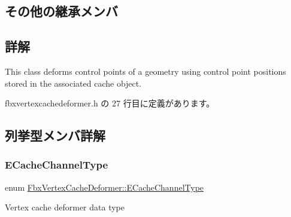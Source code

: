 \subsection*{その他の継承メンバ}


\subsection{詳解}
This class deforms control points of a geometry using control point positions stored in the associated cache object. 

 fbxvertexcachedeformer.\+h の 27 行目に定義があります。



\subsection{列挙型メンバ詳解}
\mbox{\label{class_fbx_vertex_cache_deformer_a24f0c46d4f47717615852a8e7346efed}} 
\subsubsection{\texorpdfstring{E\+Cache\+Channel\+Type}{ECacheChannelType}}
{\footnotesize\ttfamily enum \hyperlink{class_fbx_vertex_cache_deformer_a24f0c46d4f47717615852a8e7346efed}{Fbx\+Vertex\+Cache\+Deformer\+::\+E\+Cache\+Channel\+Type}}



Vertex cache deformer data type 

